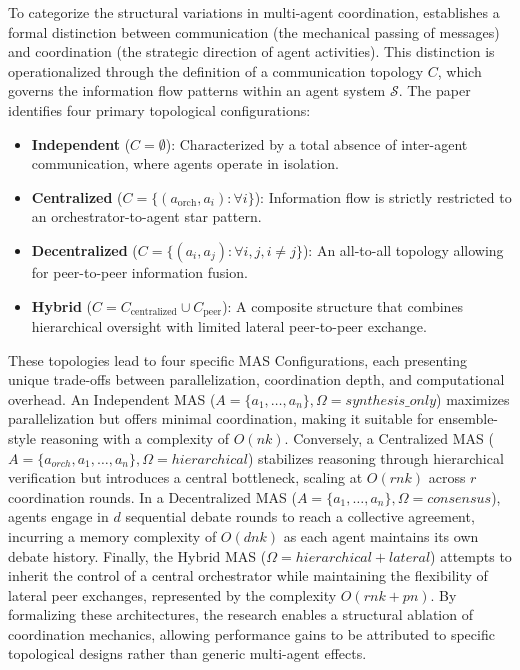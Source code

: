 To categorize the structural variations in multi-agent coordination, \citet{kim2025sciencescalingagentsystems} establishes a formal distinction between communication (the mechanical passing of messages) and coordination (the strategic direction of agent activities). 
This distinction is operationalized through the definition of a communication topology $C$, which governs the information flow patterns within an agent system $\mathcal{S}$. 
The paper identifies four primary topological configurations:
\begin{itemize}
    \item \textbf{Independent} ($C = \emptyset$): Characterized by a total absence of inter-agent communication, where agents operate in isolation.
    
    \item \textbf{Centralized} ($C = \{(a_{\text{orch}}, a_i) : \forall i\}$): Information flow is strictly restricted to an orchestrator-to-agent star pattern.
    
    \item \textbf{Decentralized} ($C = \{(a_i, a_j) : \forall i, j, i \neq j\}$): An all-to-all topology allowing for peer-to-peer information fusion.
    
    \item \textbf{Hybrid} ($C = C_{\text{centralized}} \cup C_{\text{peer}}$): A composite structure that combines hierarchical oversight with limited lateral peer-to-peer exchange.
\end{itemize}
These topologies lead to four specific MAS Configurations, each presenting unique trade-offs between parallelization, coordination depth, and computational overhead. An Independent MAS ($A = \{a_1, \dots, a_n\}, \Omega = synthesis\_only$) maximizes parallelization but offers minimal coordination, making it suitable for ensemble-style reasoning with a complexity of $O(nk)$. 
Conversely, a Centralized MAS ($A = \{a_{orch}, a_1, \dots, a_n\}, \Omega = hierarchical$) stabilizes reasoning through hierarchical verification but introduces a central bottleneck, scaling at $O(rnk)$ across $r$ coordination rounds. 
In a Decentralized MAS ($A = \{a_1, \dots, a_n\}, \Omega = consensus$), agents engage in $d$ sequential debate rounds to reach a collective agreement, incurring a memory complexity of $O(dnk)$ as each agent maintains its own debate history. 
Finally, the Hybrid MAS ($\Omega = hierarchical + lateral$) attempts to inherit the control of a central orchestrator while maintaining the flexibility of lateral peer exchanges, represented by the complexity $O(rnk + pn)$. 
By formalizing these architectures, the research enables a structural ablation of coordination mechanics, allowing performance gains to be attributed to specific topological designs rather than generic multi-agent effects.

